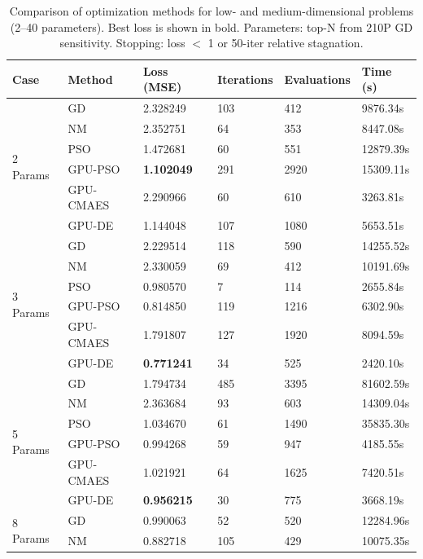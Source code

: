 \begin{table}[h!]
\centering
\caption{Comparison of optimization methods for low- and medium-dimensional problems (2--40 parameters). Best loss is shown in bold. Parameters: top-N from 210P GD sensitivity. Stopping: loss $<$ 1 or 50-iter relative stagnation.}
\label{tab:results_low}
\begin{tabular}{llllll}
\toprule
\textbf{Case} & \textbf{Method} & \textbf{Loss (MSE)} & \textbf{Iterations} & \textbf{Evaluations} & \textbf{Time (s)} \\
\midrule
 \multirow{6}{*}{2 Params} & GD           & 2.328249 & 103 & 412 & 9876.34s \\
  & NM           & 2.352751 & 64 & 353 & 8447.08s \\
  & PSO          & 1.472681 & 60 & 551 & 12879.39s \\
  & GPU-PSO      & \textbf{1.102049} & 291 & 2920 & 15309.11s \\
  & GPU-CMAES    & 2.290966 & 60 & 610 & 3263.81s \\
  & GPU-DE       & 1.144048 & 107 & 1080 & 5653.51s \\
\midrule
 \multirow{6}{*}{3 Params} & GD           & 2.229514 & 118 & 590 & 14255.52s \\
  & NM           & 2.330059 & 69 & 412 & 10191.69s \\
  & PSO          & 0.980570 & 7 & 114 & 2655.84s \\
  & GPU-PSO      & 0.814850 & 119 & 1216 & 6302.90s \\
  & GPU-CMAES    & 1.791807 & 127 & 1920 & 8094.59s \\
  & GPU-DE       & \textbf{0.771241} & 34 & 525 & 2420.10s \\
\midrule
 \multirow{6}{*}{5 Params} & GD           & 1.794734 & 485 & 3395 & 81602.59s \\
  & NM           & 2.363684 & 93 & 603 & 14309.04s \\
  & PSO          & 1.034670 & 61 & 1490 & 35835.30s \\
  & GPU-PSO      & 0.994268 & 59 & 947 & 4185.55s \\
  & GPU-CMAES    & 1.021921 & 64 & 1625 & 7420.51s \\
  & GPU-DE       & \textbf{0.956215} & 30 & 775 & 3668.19s \\
\midrule
 \multirow{6}{*}{8 Params} & GD           & 0.990063 & 52 & 520 & 12284.96s \\
  & NM           & 0.882718 & 105 & 429 & 10075.35s \\

\end{tabular}
\end{table}
